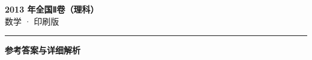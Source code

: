 \documentclass[zihao=5, a4paper]{ctexart}
\begin{document}
\begin{center}
  {\Large\bfseries 2013 年全国Ⅱ卷（理科）}\\[4pt]
  {\large 数学 · 印刷版}
\end{center}
\medskip
{}

\par\bigskip\hrule\bigskip
{}
\begin{center}{\large\bfseries 参考答案与详细解析}\end{center}
\smallskip

\end{document}
